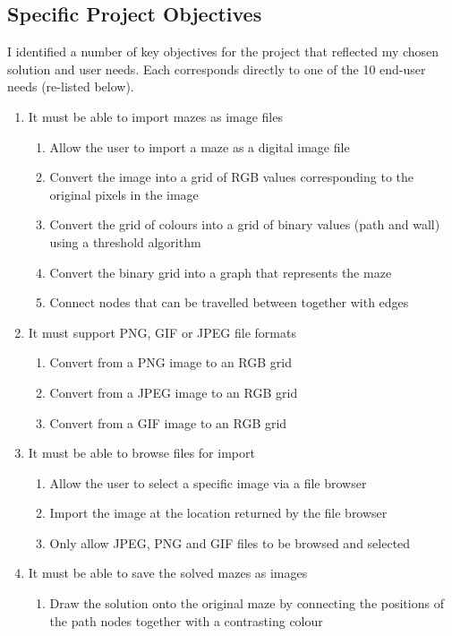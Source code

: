 \documentclass[titlepage]{article}
\begin{document}
\subsection{Specific Project Objectives}
I identified a number of key objectives for the project that reflected my chosen solution and user needs. Each corresponds directly to one of the 10 end-user needs (re-listed below).
\begin{enumerate} [{Need }1:]
\item It must be able to import mazes as image files
\begin{enumerate} [{Obj 1.}1:]
\item Allow the user to import a maze as a digital image file
\item Convert the image into a grid of RGB values corresponding to the original pixels in the image
\item Convert the grid of colours into a grid of binary values (path and wall) using a threshold algorithm
\item Convert the binary grid into a graph that represents the maze
\item Connect nodes that can be travelled between together with edges
\end{enumerate}
\item It must support PNG, GIF or JPEG file formats
\begin{enumerate} [{Obj 2.}1:]
\item Convert from a PNG image to an RGB grid
\item Convert from a JPEG image to an RGB grid
\item Convert from a GIF image to an RGB grid
\end{enumerate}
\item It must be able to browse files for import
\begin{enumerate} [{Obj 3.}1:]
\item Allow the user to select a specific image via a file browser
\item Import the image at the location returned by the file browser
\item Only allow JPEG, PNG and GIF files to be browsed and selected
\end{enumerate}
\item It must be able to save the solved mazes as images 
\begin{enumerate} [{Obj 4.}1:]
\item Draw the solution onto the original maze by connecting the positions of the path nodes together with a contrasting colour

\end{enumerate}
\end{enumerate}
\end{document}

